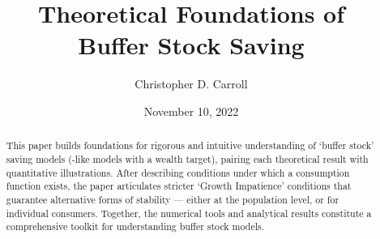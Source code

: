 \documentclass[BufferStockTheory]{subfiles}
\begin{document}



\title{Theoretical Foundations of \\ Buffer Stock Saving}

\author{Christopher D. Carroll\authNum}



\renewcommand{\forcedate}{November 10, 2022}\date{\forcedate}

\maketitle
\hypertarget{abstract}{}
\begin{abstract}
  This paper builds foundations for rigorous and intuitive understanding of `buffer stock' saving models (\cite{bewleyPIH}-like models with a wealth target), pairing each theoretical result with quantitative illustrations.  After describing conditions under which a consumption function exists, the paper articulates stricter `Growth Impatience' conditions that guarantee alternative forms of stability --- either at the population level, or for individual consumers.  Together, the numerical tools and analytical results constitute a comprehensive toolkit for understanding buffer stock models.
\end{abstract}

\hypertarget{links}{}
\end{document}
